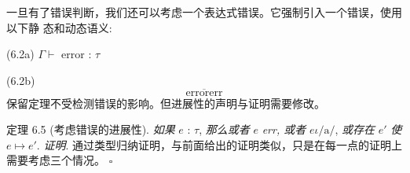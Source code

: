 一旦有了错误判断，我们还可以考虑一个表达式错误。它强制引入一个错误，使用以下静
态和动态语义: 

(6.2a)
$\Gamma\vdash$ error : $\tau$

(6.2b)
$$
\overline{\mathrm{e}\mathrm{r}\mathrm{r}\mathrm{o}\mathrm{r}\mathrm{e}\mathrm{r}\mathrm{r}}
$$
保留定理不受检测错误的影响。但进展性的声明与证明需要修改。



定理 6.5 (考虑错误的进展性). {\it 如果} $e$ : $\tau$, {\it 那么或者} $e$ {\it err, 或者} $e \iota/\mathrm{a}/$, {\it 或存在} $e'$ {\it 使}$e\mapsto e'.$
{\it 证明}. 通过类型归纳证明，与前面给出的证明类似，只是在每一点的证明上需要考虑三个情况。 $\square $

